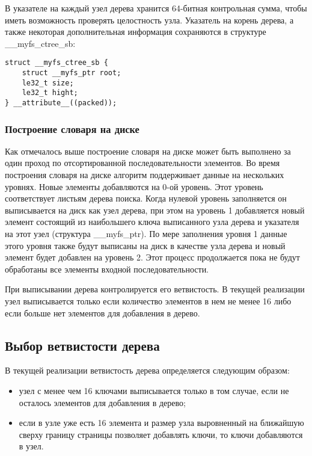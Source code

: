 В указателе на каждый узел дерева хранится 64-битная контрольная сумма, чтобы
иметь возможность проверять целостность узла. Указатель на корень дерева, а
также некоторая дополнительная информация сохраняются в структуре
\_\_myfs\_ctree\_sb:
\begin{lstlisting}
struct __myfs_ctree_sb {
    struct __myfs_ptr root;
    le32_t size;
    le32_t hight;
} __attribute__((packed));
\end{lstlisting}


\subsubsection{Построение словаря на диске}

Как отмечалось выше построение словаря на диске может быть выполнено за один
проход по отсортированной последовательности элементов. Во время построения
словаря на диске алгоритм поддерживает данные на нескольких уровнях. Новые
элементы добавляются на 0-ой уровень. Этот уровень соответствует листьям дерева
поиска. Когда нулевой уровень заполняется он выписывается на диск как узел
дерева, при этом на уровень 1 добавляется новый элемент состоящий из наибольшего
ключа выписанного узла дерева и указателя на этот узел (структура
\_\_myfs\_ptr). По мере заполнения уровня 1 данные этого уровня также будут
выписаны на диск в качестве узла дерева и новый элемент будет добавлен на
уровень 2. Этот процесс продолжается пока не будут обработаны все элементы
входной последовательности.

При выписывании дерева контролируется его ветвистость. В текущей реализации
узел выписывается только если количество элементов в нем не менее 16 либо
если больше нет элементов для добавления в дерево. 


\subsection{Выбор ветвистости дерева}

В текущей реализации ветвистость дерева определяется следующим образом:
\begin{itemize}
  \item узел с менее чем 16 ключами выписывается только в том случае, если не
        осталось элементов для добавления в дерево;
  \item если в узле уже есть 16 элемента и размер узла выровненный на ближайшую
        сверху границу страницы позволяет добавлять ключи, то ключи добавляются
        в узел.
\end{itemize}

